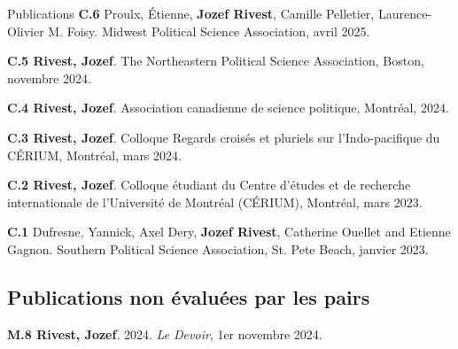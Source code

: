 \documentclass{resume} %
\begin{document}
\begin{rSection}{Publications}
{\textbf{C.6} Proulx, Étienne, \textbf{Jozef Rivest}, Camille Pelletier, Laurence-Olivier M. Foisy.  Midwest Political Science Association, avril 2025.}

{\textbf{C.5 Rivest, Jozef}.  The Northeastern Political Science Association, Boston, novembre 2024.}

{\textbf{C.4 Rivest, Jozef}.  Association canadienne de science politique, Montréal, 2024.}

{\textbf{C.3 Rivest, Jozef}.  Colloque Regards croisés et pluriels sur l'Indo-pacifique du CÉRIUM, Montréal, mars 2024.}

{\textbf{C.2 Rivest, Jozef}.  Colloque étudiant du Centre d'études et de recherche internationale de l'Université de Montréal (CÉRIUM), Montréal, mars 2023.} \par

{\textbf{C.1} Dufresne, Yannick, Axel Dery, \textbf{Jozef Rivest}, Catherine Ouellet and Etienne Gagnon.  Southern Political Science Association, St. Pete Beach, janvier 2023.}



\subsection*{Publications non évaluées par les pairs}

{\textbf{M.8 Rivest, Jozef}. 2024.  \textit{Le Devoir}, 1er novembre 2024.}


\end{rSection}
\end{document}
